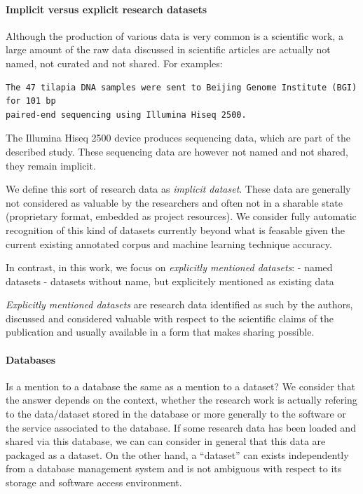 \documentclass[
]{article}
\begin{document}
\hypertarget{implicit-versus-explicit-research-datasets}{%
\paragraph{Implicit versus explicit research
datasets}\label{implicit-versus-explicit-research-datasets}}

Although the production of various data is very common is a scientific
work, a large amount of the raw data discussed in scientific articles
are actually not named, not curated and not shared. For examples:

\begin{verbatim}
The 47 tilapia DNA samples were sent to Beijing Genome Institute (BGI) for 101 bp 
paired-end sequencing using Illumina Hiseq 2500. 
\end{verbatim}

The Illumina Hiseq 2500 device produces sequencing data, which are part
of the described study. These sequencing data are however not named and
not shared, they remain implicit.

We define this sort of research data as \emph{implicit dataset}. These
data are generally not considered as valuable by the researchers and
often not in a sharable state (proprietary format, embedded as project
resources). We consider fully automatic recognition of this kind of
datasets currently beyond what is feasable given the current existing
annotated corpus and machine learning technique accuracy.

In contrast, in this work, we focus on \emph{explicitly mentioned
datasets}: - named datasets - datasets without name, but explicitely
mentioned as existing data

\emph{Explicitly mentioned datasets} are research data identified as
such by the authors, discussed and considered valuable with respect to
the scientific claims of the publication and usually available in a form
that makes sharing possible.

\hypertarget{databases}{%
\paragraph{Databases}\label{databases}}

Is a mention to a database the same as a mention to a dataset? We
consider that the answer depends on the context, whether the research
work is actually refering to the data/dataset stored in the database or
more generally to the software or the service associated to the
database. If some research data has been loaded and shared via this
database, we can can consider in general that this data are packaged as
a dataset. On the other hand, a ``dataset'' can exists independently
from a database management system and is not ambiguous with respect to
its storage and software access environment.
\end{document}
